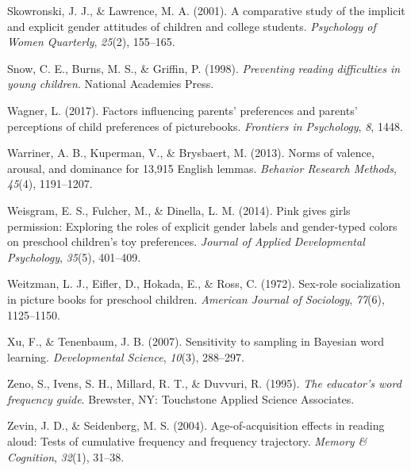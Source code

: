 \documentclass[english,,man,floatsintext]{apa6}
\begin{document}
\leavevmode\hypertarget{ref-skowronski2001comparative}{}%
Skowronski, J. J., \& Lawrence, M. A. (2001). A comparative study of the implicit and explicit gender attitudes of children and college students. \emph{Psychology of Women Quarterly}, \emph{25}(2), 155--165.

\leavevmode\hypertarget{ref-snow1998preventing}{}%
Snow, C. E., Burns, M. S., \& Griffin, P. (1998). \emph{Preventing reading difficulties in young children}. National Academies Press.

\leavevmode\hypertarget{ref-wagner2017factors}{}%
Wagner, L. (2017). Factors influencing parents' preferences and parents' perceptions of child preferences of picturebooks. \emph{Frontiers in Psychology}, \emph{8}, 1448.

\leavevmode\hypertarget{ref-warriner2013norms}{}%
Warriner, A. B., Kuperman, V., \& Brysbaert, M. (2013). Norms of valence, arousal, and dominance for 13,915 English lemmas. \emph{Behavior Research Methods}, \emph{45}(4), 1191--1207.

\leavevmode\hypertarget{ref-weisgram2014pink}{}%
Weisgram, E. S., Fulcher, M., \& Dinella, L. M. (2014). Pink gives girls permission: Exploring the roles of explicit gender labels and gender-typed colors on preschool children's toy preferences. \emph{Journal of Applied Developmental Psychology}, \emph{35}(5), 401--409.

\leavevmode\hypertarget{ref-weitzman1972sex}{}%
Weitzman, L. J., Eifler, D., Hokada, E., \& Ross, C. (1972). Sex-role socialization in picture books for preschool children. \emph{American Journal of Sociology}, \emph{77}(6), 1125--1150.

\leavevmode\hypertarget{ref-xu2007b}{}%
Xu, F., \& Tenenbaum, J. B. (2007). Sensitivity to sampling in Bayesian word learning. \emph{Developmental Science}, \emph{10}(3), 288--297.

\leavevmode\hypertarget{ref-tasa_norms}{}%
Zeno, S., Ivens, S. H., Millard, R. T., \& Duvvuri, R. (1995). \emph{The educator's word frequency guide}. Brewster, NY: Touchstone Applied Science Associates.

\leavevmode\hypertarget{ref-zevin2004age}{}%
Zevin, J. D., \& Seidenberg, M. S. (2004). Age-of-acquisition effects in reading aloud: Tests of cumulative frequency and frequency trajectory. \emph{Memory \& Cognition}, \emph{32}(1), 31--38.
\end{document}
